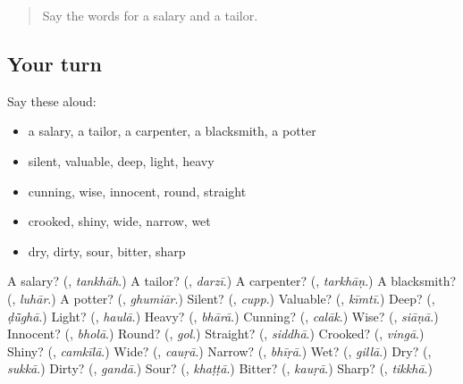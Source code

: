 \begin{quote}
Say the words for a salary and a tailor.
\end{quote}

\subsection*{Your turn}
Say these aloud:

\begin{itemize}
\raggedright
  \item a salary, a tailor, a carpenter, a blacksmith, a potter
  \item silent, valuable, deep, light, heavy
  \item cunning, wise, innocent, round, straight
  \item crooked, shiny, wide, narrow, wet
  \item dry, dirty, sour, bitter, sharp
\end{itemize}

\begin{tcolorbox}[breakable,colback=teal!4,colframe=teal!35!black,title={Before you move on}]
A salary? (\textbf{}, \emph{tankhāh}.) A tailor? (\textbf{}, \emph{darzī}.) A carpenter? (\textbf{}, \emph{tarkhāṇ}.) A blacksmith? (\textbf{}, \emph{luhār}.) A potter? (\textbf{}, \emph{ghumiār}.) Silent? (\textbf{}, \emph{cupp}.) Valuable? (\textbf{}, \emph{kīmtī}.) Deep? (\textbf{}, \emph{ḍū̃ghā}.) Light? (\textbf{}, \emph{haulā}.) Heavy? (\textbf{}, \emph{bhārā}.) Cunning? (\textbf{}, \emph{calāk}.) Wise? (\textbf{}, \emph{siāṇā}.) Innocent? (\textbf{}, \emph{bholā}.) Round? (\textbf{}, \emph{gol}.) Straight? (\textbf{}, \emph{siddhā}.) Crooked? (\textbf{}, \emph{vingā}.) Shiny? (\textbf{}, \emph{camkīlā}.) Wide? (\textbf{}, \emph{cauṛā}.) Narrow? (\textbf{}, \emph{bhīṛā}.) Wet? (\textbf{}, \emph{gillā}.) Dry? (\textbf{}, \emph{sukkā}.) Dirty? (\textbf{}, \emph{gandā}.) Sour? (\textbf{}, \emph{khaṭṭā}.) Bitter? (\textbf{}, \emph{kauṛā}.) Sharp? (\textbf{}, \emph{tikkhā}.)
\end{tcolorbox}
